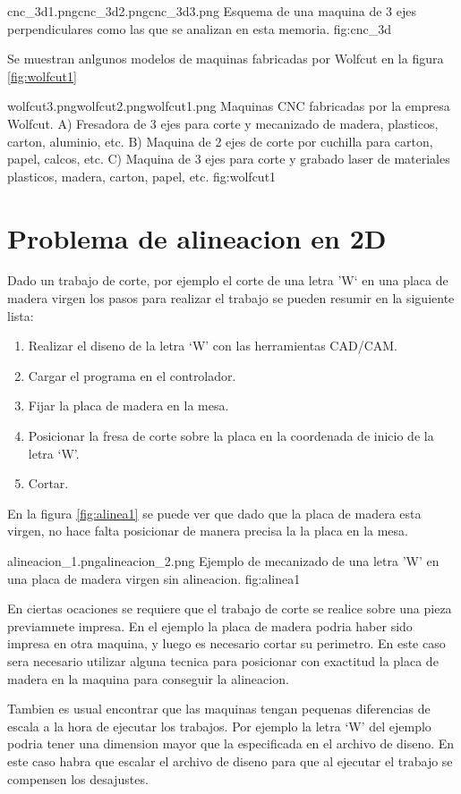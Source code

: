             {cnc_3d1.png}{cnc_3d2.png}{cnc_3d3.png}
            {Esquema de una maquina de 3 ejes perpendiculares como las que se analizan en esta memoria.}
            {fig:cnc_3d}

Se muestran anlgunos modelos de maquinas fabricadas por Wolfcut en la figura \ref{fig:wolfcut1}

            {wolfcut3.png}{wolfcut2.png}{wolfcut1.png}
            {Maquinas CNC fabricadas por la empresa Wolfcut. A) Fresadora de 3 ejes para corte y mecanizado de madera, plasticos, carton, aluminio, etc. B) Maquina de 2 ejes de corte por cuchilla para carton, papel, calcos, etc. C) Maquina de 3 ejes para corte y grabado laser de materiales plasticos, madera, carton, papel, etc.}
            {fig:wolfcut1}


\section{Problema de alineacion en 2D}

Dado un trabajo de corte, por ejemplo el corte de una letra 'W` en una placa de madera virgen los pasos para realizar el trabajo se pueden resumir en la siguiente lista:
   \begin{enumerate}
   \item{Realizar el diseno de la letra `W' con las herramientas CAD/CAM.}
   \item{Cargar el programa en el controlador.}
   \item{Fijar la placa de madera en la mesa.}
   \item{Posicionar la fresa de corte sobre la placa en la coordenada de inicio de la letra `W'.}
   \item{Cortar.}
   \end{enumerate}

   En la figura \ref{fig:alinea1} se puede ver que dado que la placa de madera esta virgen, no hace falta posicionar de manera precisa la la placa en la mesa.

            {alineacion_1.png}{alineacion_2.png}
            {Ejemplo de mecanizado de una letra 'W' en una placa de madera virgen sin alineacion.}
            {fig:alinea1}

En ciertas ocaciones se requiere que el trabajo de corte se realice sobre una pieza previamnete impresa. En el ejemplo la placa de madera podria haber sido impresa en otra maquina, y luego es necesario cortar su perimetro.
   En este caso sera necesario utilizar alguna tecnica para posicionar con exactitud la placa de madera en la maquina para conseguir la alineacion.
\par
   Tambien es usual encontrar que las maquinas tengan pequenas diferencias de escala a la hora de ejecutar los trabajos.
   Por ejemplo la letra `W' del ejemplo podria tener una dimension mayor que la especificada en el archivo de diseno.
   En este caso habra que escalar el archivo de diseno para que al ejecutar el trabajo se compensen los desajustes.
\par

